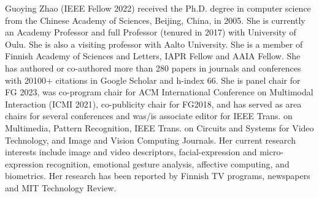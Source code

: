 \documentclass[10pt,journal,compsoc]{IEEEtran}
\begin{document}
	
\begin{IEEEbiography}{Guoying Zhao}
(IEEE Fellow 2022) received the Ph.D. degree in computer science from the Chinese Academy of Sciences, Beijing, China, in 2005. She is currently an Academy Professor and full Professor (tenured in 2017) with University of Oulu. She is also a visiting professor with Aalto University. She is a member of Finnish Academy of Sciences and Letters, IAPR Fellow and AAIA Fellow. She has authored or co-authored more than 280 papers in journals and conferences with 20100+ citations in Google Scholar and h-index 66. She is panel chair for FG 2023, was co-program chair for ACM International Conference on Multimodal Interaction (ICMI 2021), co-publicity chair for FG2018, and has served as area chairs for several conferences and was/is associate editor for IEEE Trans. on Multimedia, Pattern Recognition, IEEE Trans. on Circuits and Systems for Video Technology, and Image and Vision Computing Journals. Her current research interests include image and video descriptors, facial-expression and micro-expression recognition, emotional gesture analysis, affective computing, and biometrics. Her research has been reported by Finnish TV programs, newspapers and MIT Technology Review.
\end{IEEEbiography}
\end{document}
